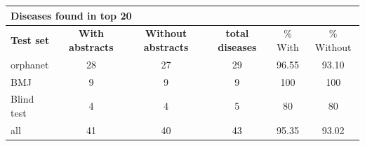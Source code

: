 \documentclass[10pt,letterpaper,final]{article}
\begin{document}
\begin{center}
\begin{small}
\begin{tabular}{l|cc||ccc}
	\multicolumn{6}{l}{\textbf{Diseases found in top 20}} \\ \hline
\textbf{Test set} & \textbf{With abstracts} &	\textbf{Without abstracts}	 &	\textbf{total diseases} &	\% With &\% Without \\ \hline
orphanet    &    28   &   27   & 29      & 96.55     & 93.10 \\
BMJ	        &    9   &    9  &    9   &   100   & 100 \\
Blind test	&    4   &    4  &    5   &    80  & 80 \\ \hline \hline
all	        &    41   &  40    &   43    &   95.35   & 93.02 \\ \hline
\end{tabular}
\end{small}
\end{center}
\end{document}
